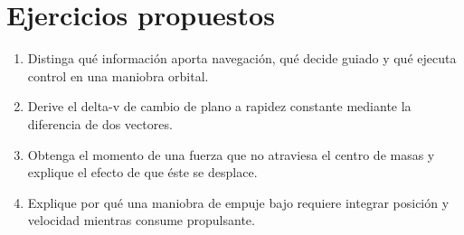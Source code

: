 \section{Ejercicios propuestos}
\begin{enumerate}
\item Distinga qué información aporta navegación, qué decide guiado y qué ejecuta control en una maniobra orbital.
\item Derive el delta-v de cambio de plano a rapidez constante mediante la diferencia de dos vectores.
\item Obtenga el momento de una fuerza que no atraviesa el centro de masas y explique el efecto de que éste se desplace.
\item Explique por qué una maniobra de empuje bajo requiere integrar posición y velocidad mientras consume propulsante.
\end{enumerate}


\studiumchaptercheck
